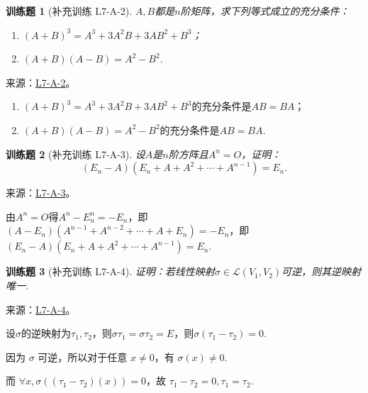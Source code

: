 \documentclass[12pt,fontset=fandol]{ctexart}
\newtheorem{exercise}{训练题}[section]
\begin{document}
\begin{exercise}[补充训练 L7-A-2]\label{prob:L7-A-2}
$A,B$都是$n$阶矩阵，求下列等式成立的充分条件：
        \begin{enumerate}
            \item $(A+B)^3=A^3+3A^2B+3AB^2+B^3$；

            \item $(A+B)(A-B)=A^2-B^2$.
        \end{enumerate}
\end{exercise}
\noindent 来源：\href{https://github.com/yhwu-is/Linear-Algebra-Left-Undone/blob/new/%E8%AE%B2%E4%B9%89/%E4%B8%93%E9%A2%98/7%20%E7%BA%BF%E6%80%A7%E6%98%A0%E5%B0%84%E7%9F%A9%E9%98%B5%E8%A1%A8%E7%A4%BA%E4%B8%8E%E7%9F%A9%E9%98%B5%E8%BF%90%E7%AE%97%E5%9F%BA%E7%A1%80.tex}{L7-A-2}。
\begin{solve}
\begin{enumerate}
                \item $(A+B)^3=A^3+3A^2B+3AB^2+B^3$的充分条件是$AB=BA$；

                \item $(A+B)(A-B)=A^2-B^2$的充分条件是$AB=BA$.
            \end{enumerate}
\end{solve}

\begin{exercise}[补充训练 L7-A-3]\label{prob:L7-A-3}
设$A$是$n$阶方阵且$A^n=O$，证明：
        \[(E_n-A)(E_n+A+A^2+\cdots+A^{n-1})=E_n.\]
\end{exercise}
\noindent 来源：\href{https://github.com/yhwu-is/Linear-Algebra-Left-Undone/blob/new/%E8%AE%B2%E4%B9%89/%E4%B8%93%E9%A2%98/7%20%E7%BA%BF%E6%80%A7%E6%98%A0%E5%B0%84%E7%9F%A9%E9%98%B5%E8%A1%A8%E7%A4%BA%E4%B8%8E%E7%9F%A9%E9%98%B5%E8%BF%90%E7%AE%97%E5%9F%BA%E7%A1%80.tex}{L7-A-3}。
\begin{solve}
由$A^n=O$得$A^n-E_n^n=-E_n$，即$(A-E_n)(A^{n-1}+A^{n-2}+\cdots+A+E_n)=-E_n$，即$(E_n-A)(E_n+A+A^2+\cdots+A^{n-1})=E_n$.
\end{solve}

\begin{exercise}[补充训练 L7-A-4]\label{prob:L7-A-4}
证明：若线性映射$\sigma \in \mathcal{L}(V_1,V_2)$可逆，则其逆映射唯一.
\end{exercise}
\noindent 来源：\href{https://github.com/yhwu-is/Linear-Algebra-Left-Undone/blob/new/%E8%AE%B2%E4%B9%89/%E4%B8%93%E9%A2%98/7%20%E7%BA%BF%E6%80%A7%E6%98%A0%E5%B0%84%E7%9F%A9%E9%98%B5%E8%A1%A8%E7%A4%BA%E4%B8%8E%E7%9F%A9%E9%98%B5%E8%BF%90%E7%AE%97%E5%9F%BA%E7%A1%80.tex}{L7-A-4}。
\begin{solve}
设$\sigma$的逆映射为$\tau_1,\tau_2$，则$\sigma\tau_1=\sigma\tau_2=E$，则$\sigma(\tau_1-\tau_2)=0$.

            因为 $\sigma$ 可逆，所以对于任意 $x \neq 0$，有 $\sigma(x) \neq 0$.

            而 $\forall x, \sigma((\tau_1-\tau_2)(x))=0$，故 $\tau_1-\tau_2=0, \tau_1=\tau_2$.
\end{solve}
\end{document}
